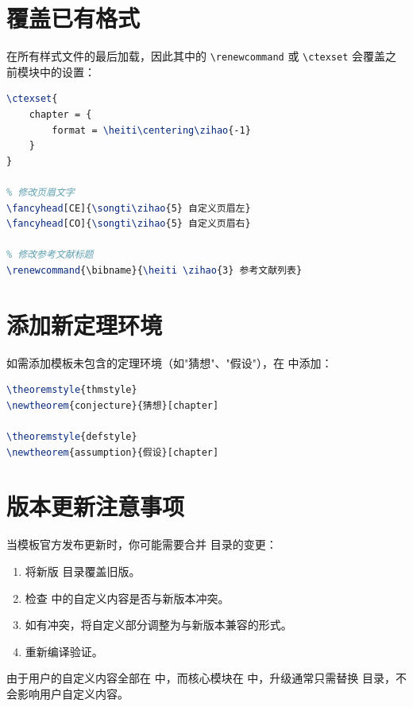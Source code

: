 \documentclass[../main-manual.tex]{subfiles}
\begin{document}
\section{覆盖已有格式}

 在所有样式文件的最后加载，因此其中的 \verb|\renewcommand| 或 \verb|\ctexset| 会覆盖之前模块中的设置：

\begin{lstlisting}[language=TeX, caption={覆盖示例}]
% 将章标题改为黑体（默认是楷体）
\ctexset{
	chapter = {
		format = \heiti\centering\zihao{-1}
	}
}

% 修改页眉文字
\fancyhead[CE]{\songti\zihao{5} 自定义页眉左}
\fancyhead[CO]{\songti\zihao{5} 自定义页眉右}

% 修改参考文献标题
\renewcommand{\bibname}{\heiti \zihao{3} 参考文献列表}
\end{lstlisting}

\section{添加新定理环境}

如需添加模板未包含的定理环境（如"猜想"、"假设"），在  中添加：

\begin{lstlisting}[language=TeX, caption={添加自定义定理环境}]
% 使用已有的定理样式
\theoremstyle{thmstyle}
\newtheorem{conjecture}{猜想}[chapter]

\theoremstyle{defstyle}
\newtheorem{assumption}{假设}[chapter]
\end{lstlisting}

\section{版本更新注意事项}

当模板官方发布更新时，你可能需要合并  目录的变更：

\begin{enumerate}[label=\textbf{第\arabic*步：}]
	\item 将新版  目录覆盖旧版。
	\item 检查  中的自定义内容是否与新版本冲突。
	\item 如有冲突，将自定义部分调整为与新版本兼容的形式。
	\item 重新编译验证。
\end{enumerate}

由于用户的自定义内容全部在  中，而核心模块在  中，升级通常只需替换  目录，不会影响用户自定义内容。
\end{document}
